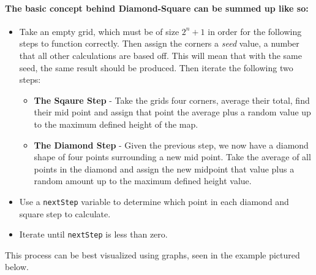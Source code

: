 \documentclass{article}
\begin{document}
\paragraph{The basic concept behind Diamond-Square can be summed up like so:}
	
\begin{itemize}

	\item
		Take an empty grid, which must be of size \(2^{n}+1\) in order for the following steps to function correctly. Then assign the corners a \emph{seed} value, a number that all other calculations are based off. This will mean that with the same seed, the same result should be produced. Then iterate the following two steps:
	\begin{itemize}
		\item
			\textbf{The Sqaure Step} - Take the grids four corners, average their total, find their mid point and assign that point the 				average plus a random value up to the maximum defined height of the map.
		\item
			\textbf{The Diamond Step} - Given the previous step, we now have a diamond shape of four points surrounding a new mid 			point. Take the average of all points in the diamond and assign the new midpoint that value plus a random amount up to the 			maximum defined height value.
	\end{itemize}
	\item
		Use a \texttt{nextStep} variable to determine which point in each diamond and square step to calculate. 
	\item
		Iterate until \texttt{nextStep} is less than zero.
		
\end{itemize}
	
This process can be best visualized using graphs, seen in the example pictured below.
	
\end{document}
